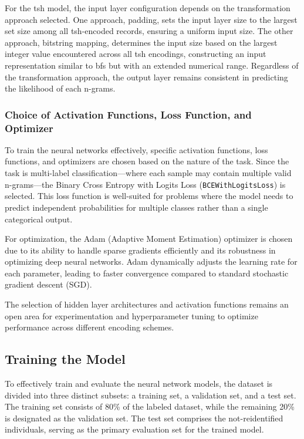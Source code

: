 For the \ac{tsh} model, the input layer configuration depends on the transformation approach selected.
One approach, padding, sets the input layer size to the largest set size among all \ac{tsh}-encoded records, ensuring a uniform input size.
The other approach, bitstring mapping, determines the input size based on the largest integer value encountered across all \ac{tsh} encodings, constructing an input representation similar to \ac{bf}s but with an extended numerical range.
Regardless of the transformation approach, the output layer remains consistent in predicting the likelihood of each n-grams.

\subsubsection{Choice of Activation Functions, Loss Function, and Optimizer}

To train the neural networks effectively, specific activation functions, loss functions, and optimizers are chosen based on the nature of the task.
Since the task is multi-label classification—where each sample may contain multiple valid n-grams—the Binary Cross Entropy with Logits Loss (\texttt{BCEWithLogitsLoss}) is selected.
This loss function is well-suited for problems where the model needs to predict independent probabilities for multiple classes rather than a single categorical output.

For optimization, the Adam (Adaptive Moment Estimation) optimizer is chosen due to its ability to handle sparse gradients efficiently and its robustness in optimizing deep neural networks.
Adam dynamically adjusts the learning rate for each parameter, leading to faster convergence compared to standard stochastic gradient descent (SGD).

The selection of hidden layer architectures and activation functions remains an open area for experimentation and hyperparameter tuning to optimize performance across different encoding schemes.

\subsection{Training the Model} \label{sec:training}

To effectively train and evaluate the neural network models, the dataset is divided into three distinct subsets: a training set, a validation set, and a test set.
The training set consists of 80\% of the labeled dataset, while the remaining 20\% is designated as the validation set.
The test set comprises the not-reidentified individuals, serving as the primary evaluation set for the trained model.

